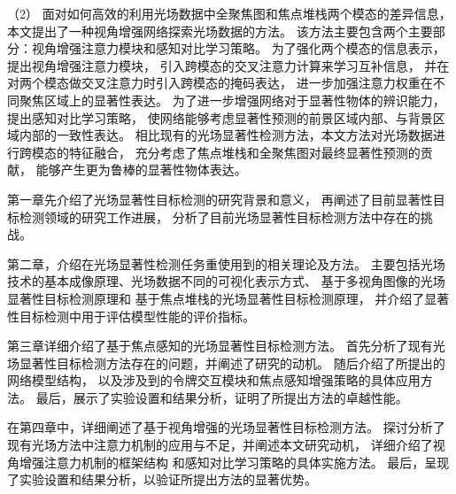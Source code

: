 %
%
（2）
%
%
面对如何高效的利用光场数据中全聚焦图和焦点堆栈两个模态的差异信息，
本文提出了一种视角增强网络探索光场数据的方法。
%
%
该方法主要包含两个主要部分：视角增强注意力模块和感知对比学习策略。
%
%
为了强化两个模态的信息表示，提出视角增强注意力模块，
引入跨模态的交叉注意力计算来学习互补信息，
并在对两个模态做交叉注意力时引入跨模态的掩码表达，
进一步加强注意力权重在不同聚焦区域上的显著性表达。
%
%
为了进一步增强网络对于显著性物体的辨识能力，
提出感知对比学习策略，
使网络能够考虑显著性预测的前景区域内部、与背景区域内部的一致性表达。
%
%
相比现有的光场显著性检测方法，本文方法对光场数据进行跨模态的特征融合，
充分考虑了焦点堆栈和全聚焦图对最终显著性预测的贡献，
能够产生更为鲁棒的显著性物体表达。






第一章先介绍了光场显著性目标检测的研究背景和意义，
再阐述了目前显著性目标检测领域的研究工作进展，
分析了目前光场显著性目标检测方法中存在的挑战。



第二章，介绍在光场显著性检测任务重使用到的相关理论及方法。
主要包括光场技术的基本成像原理、光场数据不同的可视化表示方式、
基于多视角图像的光场显著性目标检测原理和
基于焦点堆栈的光场显著性目标检测原理，
并介绍了显著性目标检测中用于评估模型性能的评价指标。


第三章详细介绍了基于焦点感知的光场显著性目标检测方法。
首先分析了现有光场显著性目标检测方法存在的问题，并阐述了研究的动机。
随后介绍了所提出的网络模型结构，
以及涉及到的令牌交互模块和焦点感知增强策略的具体应用方法。
最后，展示了实验设置和结果分析，证明了所提出方法的卓越性能。


在第四章中，详细阐述了基于视角增强的光场显著性目标检测方法。
探讨分析了现有光场方法中注意力机制的应用与不足，并阐述本文研究动机，
详细介绍了视角增强注意力机制的框架结构
和感知对比学习策略的具体实施方法。
最后，呈现了实验设置和结果分析，以验证所提出方法的显著优势。































